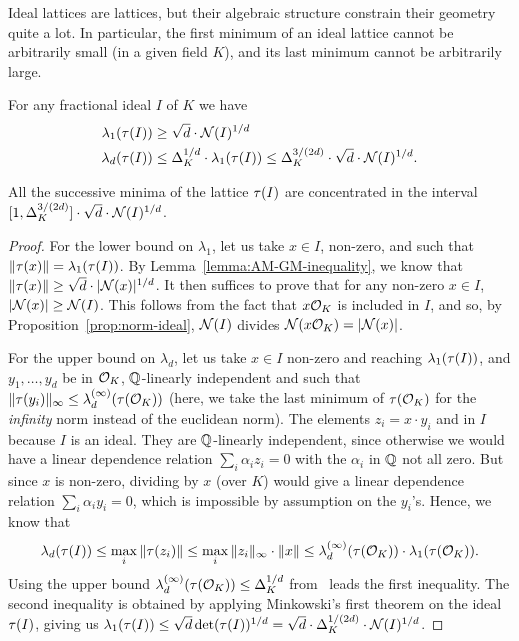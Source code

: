 Ideal lattices are lattices, but their algebraic structure constrain their geometry quite a lot. In particular, the first minimum of an ideal lattice cannot be arbitrarily small (in a given field $K$), and its last minimum cannot be arbitrarily large.

\begin{lemma}
For any fractional ideal $I$ of $K$ we have
\begin{align*}
\lambda_1(\tau(I)) &\geq \sqrt{d} \cdot \mathcal{N}(I)^{1/d} \\
\lambda_d(\tau(I)) & \leq \Delta_K^{1/d} \cdot \lambda_1(\tau(I)) \leq \Delta_K^{3/(2d)} \cdot \sqrt{d} \cdot \mathcal{N}(I)^{1/d}.
\end{align*}
\end{lemma}
All the successive minima of the lattice $\tau(I)$ are concentrated in the interval $[1, \Delta_K^{3/(2d)}] \cdot \sqrt{d} \cdot \mathcal{N}(I)^{1/d}$.

\begin{proof}
For the lower bound on $\lambda_1$, let us take $x \in I$, non-zero, and such that $\|\tau(x)\| = \lambda_1(\tau(I))$. By Lemma~\ref{lemma:AM-GM-inequality}, we know that $\|\tau(x)\| \geq \sqrt{d} \cdot |\mathcal{N}(x)|^{1/d}$. It then suffices to prove that for any non-zero $x \in I$, $|\mathcal{N}(x)| \geq \mathcal{N}(I)$. This follows from the fact that $x \mathcal{O}_K$ is included in $I$, and so, by Proposition~\ref{prop:norm-ideal}, $\mathcal{N}(I)$ divides $\mathcal{N}(x \mathcal{O}_K) = |\mathcal{N}(x)|$.

For the upper bound on $\lambda_d$, let us take $x \in I$ non-zero and reaching $\lambda_1(\tau(I))$, and $y_1, \dots, y_d$ be in $\mathcal{O}_K$, $\mathbb{Q}$-linearly independent and such that $\|\tau(y_i)\|_\infty \leq \lambda_d^{(\infty)}(\tau(\mathcal{O}_K))$ (here, we take the last minimum of $\tau(\mathcal{O}_K)$ for the \emph{infinity} norm instead of the euclidean norm). The elements $z_i = x \cdot y_i$ and in $I$ because $I$ is an ideal. They are $\mathbb{Q}$-linearly independent, since otherwise we would have a linear dependence relation $\sum_i \alpha_i z_i = 0$ with the $\alpha_i$ in $\mathbb{Q}$ not all zero. But since $x$ is non-zero, dividing by $x$ (over $K$) would give a linear dependence relation $\sum_i \alpha_i y_i = 0$, which is impossible by assumption on the $y_i$'s.
Hence, we know that 
\[\lambda_d(\tau(I)) \leq \max_i \|\tau(z_i)\| \leq \max_i \|z_i\|_\infty \cdot \|x\| \leq \lambda_d^{(\infty)}(\tau(\mathcal{O}_K)) \cdot \lambda_1(\tau(\mathcal{O}_K)).\]
Using the upper bound $\lambda_d^{(\infty)}(\tau(\mathcal{O}_K)) \leq \Delta_K^{1/d}$ from~\cite[Theorem A.4]{KoenThesis} leads the first inequality. The second inequality is obtained by applying Minkowski's first theorem on the ideal $\tau(I)$, giving us $\lambda_1(\tau(I)) \leq \sqrt{d} \det(\tau(I))^{1/d} = \sqrt{d} \cdot \Delta_K^{1/(2d)} \cdot \mathcal{N}(I)^{1/d}$.
\end{proof}


